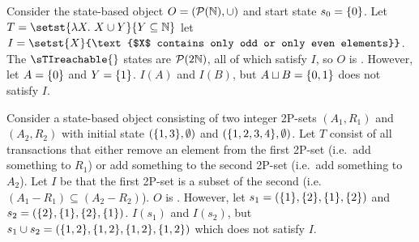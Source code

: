 \begin{example}
  Consider the state-based object $O = (\mathcal{P}(\mathbb{N}), \cup)$ and start
  state $s_0 = \{0\}$. Let $T = \setst{\lambda X.\ X \cup Y}{Y \subseteq
  \nats}$ let $I = \setst{X}{\text{$X$ contains only odd or only even
  elements}}$. The $\sTIreachable{}$ states are $\mathcal{P}(2\mathbb{N})$, all of
  which satisfy $I$, so $O$ is \sTIconfluent{}.  However, let $A = \{0\}$ and
  $Y = \{1\}$. $I(A)$ and $I(B)$, but $A \sqcup B = \{0, 1\}$ does not
  satisfy $I$.
\end{example}

\begin{example}
  Consider a state-based object consisting of two integer 2P-sets $(A_1, R_1)$
  and $(A_2, R_2)$ with initial state $(\{1, 3\}, \emptyset{})$ and $(\{1,
  2, 3, 4\}, \emptyset{})$. Let $T$ consist of all transactions that either
  remove an element from the first 2P-set (i.e.\ add something to $R_1$) or add
  something to the second 2P-set (i.e.\ add something to $A_2$). Let $I$ be
  that the first 2P-set is a subset of the second (i.e. $(A_1 - R_1) \subseteq
  (A_2 - R_2)$).
  $O$ is \sTIconfluent{}. However, let $s_1 = (\{1\}, \{2\}, \{1\},
  \{2\})$ and $s_2 = (\{2\}, \{1\}, \{2\}, \{1\})$. $I(s_1)$ and
  $I(s_2)$, but $s_1 \cup s_2 = (\{1, 2\}, \{1, 2\}, \{1, 2\}, \{1,
  2\})$ which does not satisfy $I$.
\end{example}
